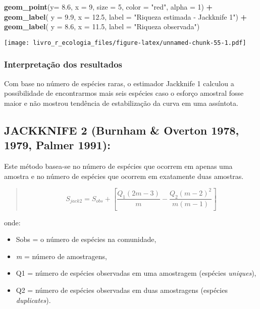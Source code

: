 \documentclass[
]{book}
\newenvironment{Shaded}{\begin{snugshade}}{\end{snugshade}}
\newcommand{\DataTypeTok}[1]{\textcolor[rgb]{0.13,0.29,0.53}{#1}}
\newcommand{\DecValTok}[1]{\textcolor[rgb]{0.00,0.00,0.81}{#1}}
\newcommand{\FloatTok}[1]{\textcolor[rgb]{0.00,0.00,0.81}{#1}}
\newcommand{\KeywordTok}[1]{\textcolor[rgb]{0.13,0.29,0.53}{\textbf{#1}}}
\newcommand{\NormalTok}[1]{#1}
\newcommand{\OperatorTok}[1]{\textcolor[rgb]{0.81,0.36,0.00}{\textbf{#1}}}
\newcommand{\StringTok}[1]{\textcolor[rgb]{0.31,0.60,0.02}{#1}}
\begin{document}
\begin{Shaded}
\begin{Highlighting}[]
\StringTok{  }\KeywordTok{geom_point}\NormalTok{(}\DataTypeTok{y=} \FloatTok{8.6}\NormalTok{, }\DataTypeTok{x =} \DecValTok{9}\NormalTok{, }\DataTypeTok{size =} \DecValTok{5}\NormalTok{, }\DataTypeTok{color =} \StringTok{"red"}\NormalTok{, }\DataTypeTok{alpha =} \DecValTok{1}\NormalTok{) }\OperatorTok{+}\StringTok{ }
\StringTok{  }\KeywordTok{geom_label}\NormalTok{( }\DataTypeTok{y =} \FloatTok{9.9}\NormalTok{, }\DataTypeTok{x =} \FloatTok{12.5}\NormalTok{, }\DataTypeTok{label =} \StringTok{"Riqueza estimada - Jackknife 1"}\NormalTok{) }\OperatorTok{+}
\StringTok{  }\KeywordTok{geom_label}\NormalTok{( }\DataTypeTok{y =} \FloatTok{8.6}\NormalTok{, }\DataTypeTok{x =} \FloatTok{11.5}\NormalTok{, }\DataTypeTok{label =} \StringTok{"Riqueza observada"}\NormalTok{)}
\end{Highlighting}
\end{Shaded}

\texttt{[image: livro\_r\_ecologia\_files/figure-latex/unnamed-chunk-55-1.pdf]}

\hypertarget{interpretauxe7uxe3o-dos-resultados-3}{%
\subsubsection{Interpretação dos resultados}\label{interpretauxe7uxe3o-dos-resultados-3}}

Com base no número de espécies raras, o estimador Jackknife 1 calculou a possibilidade de encontrarmos mais seis espécies caso o esforço amostral fosse maior e não mostrou tendência de estabilização da curva em uma assíntota.

\hypertarget{jackknife-2-burnham-overton-1978-1979-palmer-1991}{%
\subsection{JACKKNIFE 2 (Burnham \& Overton 1978, 1979, Palmer 1991):}\label{jackknife-2-burnham-overton-1978-1979-palmer-1991}}

Este método basea-se no número de espécies que ocorrem em apenas uma amostra e no número de espécies que ocorrem em exatamente duas amostras.

\begin{quote}
\[S_{jack2} = S_{obs} + \left[\frac{Q_1(2m - 3)}{m}-\frac{Q_2(m - 2)^2}{m(m-1)}\right]\]
\end{quote}

onde:

\begin{itemize}
\item
  Sobs = o número de espécies na comunidade,
\item
  \emph{m} = número de amostragens,
\item
  Q1 = número de espécies observadas em uma amostragem (espécies \emph{uniques}),
\item
  Q2 = número de espécies observadas em duas amostragens (espécies \emph{duplicates}).
\end{itemize}
\end{document}
